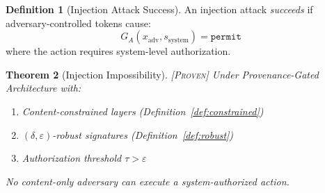 \documentclass[11pt,a4paper]{article}
\theoremstyle{plain}
\newtheorem{theorem}{Theorem}[section]
\theoremstyle{definition}
\newtheorem{definition}[theorem]{Definition}
\theoremstyle{remark}
\newcommand{\proven}{\textsc{[Proven]}}
\begin{document}
\begin{definition}[Injection Attack Success] \label{def:success}
An injection attack \emph{succeeds} if adversary-controlled tokens cause:
\begin{equation}
G_A(x_{\text{adv}}, s_{\text{system}}) = \texttt{permit}
\end{equation}
where the action requires system-level authorization.
\end{definition}

\begin{theorem}[Injection Impossibility] \label{thm:impossibility} \proven
Under Provenance-Gated Architecture with:
\begin{enumerate}
    \item Content-constrained layers (Definition~\ref{def:constrained})
    \item $(\delta, \varepsilon)$-robust signatures (Definition~\ref{def:robust})
    \item Authorization threshold $\tau > \varepsilon$
\end{enumerate}
No content-only adversary can execute a system-authorized action.
\end{theorem}
\end{document}

